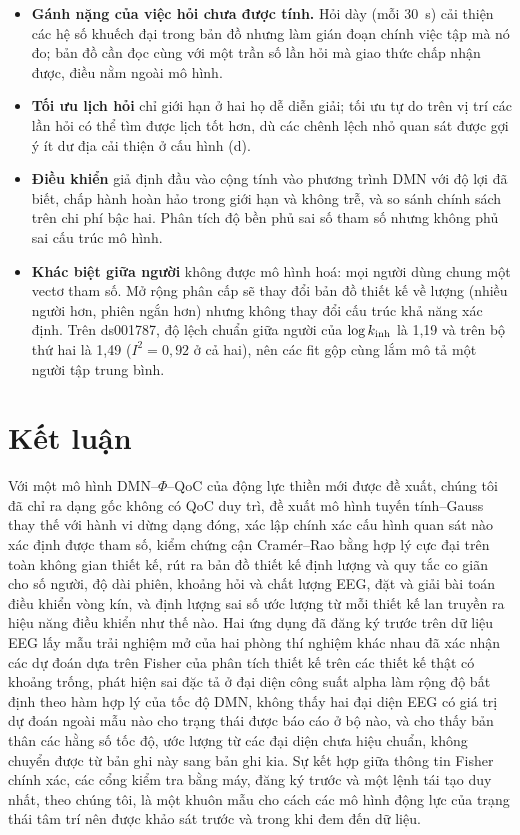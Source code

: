 \begin{itemize}
  \item \textbf{Gánh nặng của việc hỏi chưa được tính.} Hỏi dày (mỗi 30~s) cải thiện các hệ số khuếch đại trong bản đồ nhưng làm gián đoạn chính việc tập mà nó đo; bản đồ cần đọc cùng với một trần số lần hỏi mà giao thức chấp nhận được, điều nằm ngoài mô hình.
  \item \textbf{Tối ưu lịch hỏi} chỉ giới hạn ở hai họ dễ diễn giải; tối ưu tự do trên vị trí các lần hỏi có thể tìm được lịch tốt hơn, dù các chênh lệch nhỏ quan sát được gợi ý ít dư địa cải thiện ở cấu hình (d).
  \item \textbf{Điều khiển} giả định đầu vào cộng tính vào phương trình DMN với độ lợi đã biết, chấp hành hoàn hảo trong giới hạn và không trễ, và so sánh chính sách trên chi phí bậc hai. Phân tích độ bền phủ sai số tham số nhưng không phủ sai cấu trúc mô hình.
  \item \textbf{Khác biệt giữa người} không được mô hình hoá: mọi người dùng chung một vectơ tham số. Mở rộng phân cấp sẽ thay đổi bản đồ thiết kế về lượng (nhiều người hơn, phiên ngắn hơn) nhưng không thay đổi cấu trúc khả năng xác định. Trên ds001787, độ lệch chuẩn giữa người của $\log k_{\mathrm{inh}}$ là 1,19 và trên bộ thứ hai là 1,49 ($I^2=0{,}92$ ở cả hai), nên các fit gộp cùng lắm mô tả một người tập trung bình.
\end{itemize}

\section{Kết luận}
\label{sec:conclusion}

Với một mô hình DMN--$\Phi$--QoC của động lực thiền mới được đề xuất, chúng tôi đã chỉ ra dạng gốc không có QoC duy trì, đề xuất mô hình tuyến tính--Gauss thay thế với hành vi dừng dạng đóng, xác lập chính xác cấu hình quan sát nào xác định được tham số, kiểm chứng cận Cramér--Rao bằng hợp lý cực đại trên toàn không gian thiết kế, rút ra bản đồ thiết kế định lượng và quy tắc co giãn cho số người, độ dài phiên, khoảng hỏi và chất lượng EEG, đặt và giải bài toán điều khiển vòng kín, và định lượng sai số ước lượng từ mỗi thiết kế lan truyền ra hiệu năng điều khiển như thế nào. Hai ứng dụng đã đăng ký trước trên dữ liệu EEG lấy mẫu trải nghiệm mở của hai phòng thí nghiệm khác nhau đã xác nhận các dự đoán dựa trên Fisher của phân tích thiết kế trên các thiết kế thật có khoảng trống, phát hiện sai đặc tả ở đại diện công suất alpha làm rộng độ bất định theo hàm hợp lý của tốc độ DMN, không thấy hai đại diện EEG có giá trị dự đoán ngoài mẫu nào cho trạng thái được báo cáo ở bộ nào, và cho thấy bản thân các hằng số tốc độ, ước lượng từ các đại diện chưa hiệu chuẩn, không chuyển được từ bản ghi này sang bản ghi kia. Sự kết hợp giữa thông tin Fisher chính xác, các cổng kiểm tra bằng máy, đăng ký trước và một lệnh tái tạo duy nhất, theo chúng tôi, là một khuôn mẫu cho cách các mô hình động lực của trạng thái tâm trí nên được khảo sát trước và trong khi đem đến dữ liệu.

